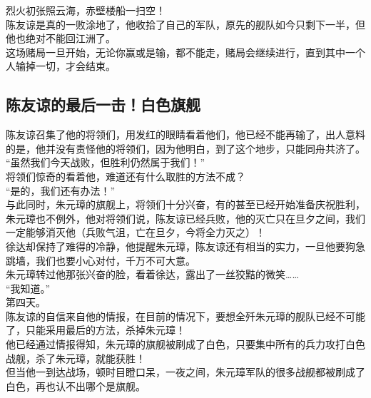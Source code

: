 \begin{multicols}{\theparacolNo}
烈火初张照云海，赤壁楼船一扫空！\\

陈友谅是真的一败涂地了，他收拾了自己的军队，原先的舰队如今只剩下一半，但他也绝对不能回江洲了。\\

这场赌局一旦开始，无论你赢或是输，都不能走，赌局会继续进行，直到其中一个人输掉一切，才会结束。\\

\subsection{陈友谅的最后一击！白色旗舰}
陈友谅召集了他的将领们，用发红的眼睛看着他们，他已经不能再输了，出人意料的是，他并没有责怪他的将领们，因为他明白，到了这个地步，只能同舟共济了。\\

“虽然我们今天战败，但胜利仍然属于我们！”\\

将领们惊奇的看着他，难道还有什么取胜的方法不成？\\

“是的，我们还有办法！”\\

与此同时，朱元璋的旗舰上，将领们十分兴奋，有的甚至已经开始准备庆祝胜利，朱元璋也不例外，他对将领们说，陈友谅已经兵败，他的灭亡只在旦夕之间，我们一定能够消灭他（兵败气沮，亡在旦夕，今将全力灭之）！\\

徐达却保持了难得的冷静，他提醒朱元璋，陈友谅还有相当的实力，一旦他要狗急跳墙，我们也要小心对付，千万不可大意。\\

朱元璋转过他那张兴奋的脸，看着徐达，露出了一丝狡黠的微笑……\\

“我知道。”\\

第四天。\\

陈友谅的自信来自他的情报，在目前的情况下，要想全歼朱元璋的舰队已经不可能了，只能采用最后的方法，杀掉朱元璋！\\

他已经通过情报得知，朱元璋的旗舰被刷成了白色，只要集中所有的兵力攻打白色战舰，杀了朱元璋，就能获胜！\\

但当他一到达战场，顿时目瞪口呆，一夜之间，朱元璋军队的很多战舰都被刷成了白色，再也认不出哪个是旗舰。\\


\end{multicols}
